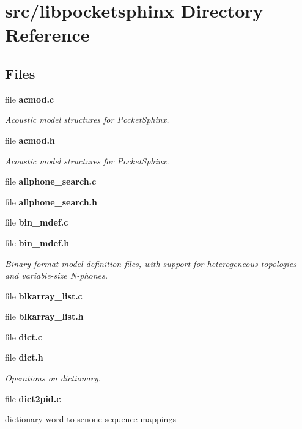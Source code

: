 \section{src/libpocketsphinx Directory Reference}
\label{dir_8d034a1e03e98d9b7ac467250bbebdea}
\subsection*{Files}
\begin{DoxyCompactItemize}
\item 
file {\bf acmod.\-c}
\begin{DoxyCompactList}\small\item\em Acoustic model structures for Pocket\-Sphinx. \end{DoxyCompactList}\item 
file {\bf acmod.\-h}
\begin{DoxyCompactList}\small\item\em Acoustic model structures for Pocket\-Sphinx. \end{DoxyCompactList}\item 
file {\bfseries allphone\-\_\-search.\-c}
\item 
file {\bfseries allphone\-\_\-search.\-h}
\item 
file {\bfseries bin\-\_\-mdef.\-c}
\item 
file {\bf bin\-\_\-mdef.\-h}
\begin{DoxyCompactList}\small\item\em Binary format model definition files, with support for heterogeneous topologies and variable-\/size N-\/phones. \end{DoxyCompactList}\item 
file {\bfseries blkarray\-\_\-list.\-c}
\item 
file {\bfseries blkarray\-\_\-list.\-h}
\item 
file {\bfseries dict.\-c}
\item 
file {\bf dict.\-h}
\begin{DoxyCompactList}\small\item\em Operations on dictionary. \end{DoxyCompactList}\item 
file {\bf dict2pid.\-c}
\begin{DoxyCompactList}\small\item\em 
\begin{DoxyItemize}
\item dictionary word to senone sequence mappings 

\end{DoxyItemize}
\end{DoxyCompactList}
\end{DoxyCompactItemize}
